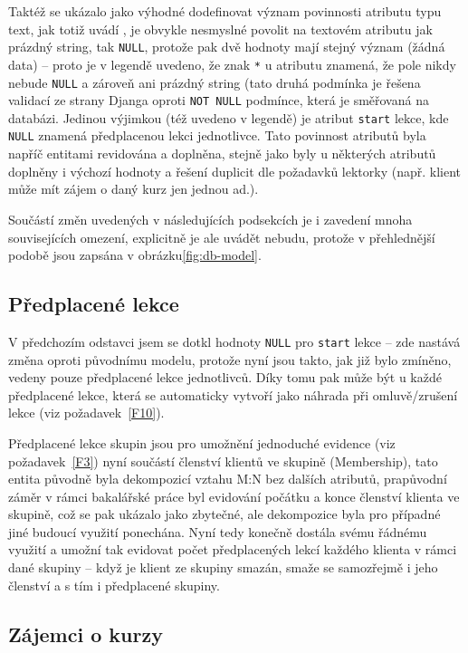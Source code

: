 Taktéž se ukázalo jako výhodné dodefinovat význam povinnosti atributu typu text, jak totiž uvádí \cite{django-docs-model}, je obvykle nesmyslné povolit na textovém atributu jak prázdný string, tak \verb|NULL|, protože pak dvě hodnoty mají stejný význam (žádná data) -- proto je v legendě uvedeno, že znak \verb|*| u atributu znamená, že pole nikdy nebude \verb|NULL| a zároveň ani prázdný string (tato druhá podmínka je řešena validací ze strany Djanga oproti \verb|NOT NULL| podmínce, která je směřovaná na databázi. Jedinou výjimkou (též uvedeno v legendě) je atribut \verb|start| lekce, kde \verb|NULL| znamená předplacenou lekci jednotlivce. Tato povinnost atributů byla napříč entitami revidována a doplněna, stejně jako byly u některých atributů doplněny i výchozí hodnoty a řešení duplicit dle požadavků lektorky (např. klient může mít zájem o daný kurz jen jednou ad.).

Součástí změn uvedených v následujících podsekcích je i zavedení mnoha souvisejících omezení, explicitně je ale uvádět nebudu, protože v přehlednější podobě jsou zapsána v obrázku\ref{fig:db-model}.

\subsection{Předplacené lekce}

V předchozím odstavci jsem se dotkl hodnoty \verb|NULL| pro \verb|start| lekce -- zde nastává změna oproti původnímu modelu, protože nyní jsou takto, jak již bylo zmíněno, vedeny pouze předplacené lekce jednotlivců. Díky tomu pak může být u každé předplacené lekce, která se automaticky vytvoří jako náhrada při omluvě/zrušení lekce (viz požadavek~\ref{F10}).

Předplacené lekce skupin jsou pro umožnění jednoduché evidence (viz požadavek~\ref{F3}) nyní součástí členství klientů ve skupině (Membership), tato entita původně byla dekompozicí vztahu M:N bez dalších atributů, prapůvodní záměr v rámci bakalářské práce byl evidování počátku a konce členství klienta ve skupině, což se pak ukázalo jako zbytečné, ale dekompozice byla pro případné jiné budoucí využití ponechána. Nyní tedy konečně dostála svému řádnému využití a umožní tak evidovat počet předplacených lekcí každého klienta v rámci dané skupiny -- když je klient ze skupiny smazán, smaže se samozřejmě i jeho členství a s tím i předplacené skupiny.

\subsection{Zájemci o kurzy}

